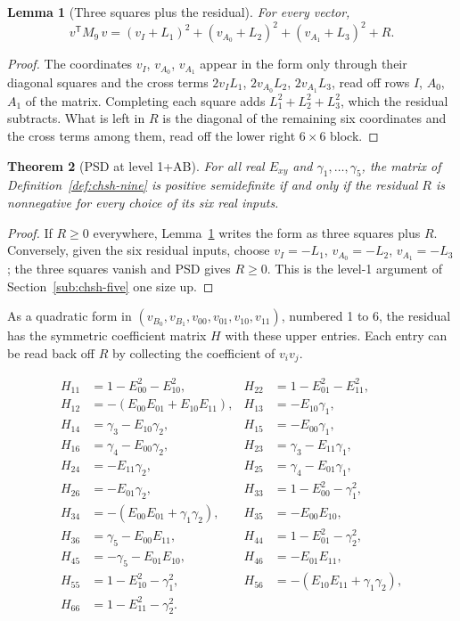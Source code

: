 \documentclass[11pt,twoside]{article}
\theoremstyle{thielethm}
\newtheorem{theorem}{Theorem}[section]
\newtheorem{lemma}[theorem]{Lemma}
\theoremstyle{thieledef}
\theoremstyle{thieledef}
\theoremstyle{thieledef}
\theoremstyle{thielethm}
\theoremstyle{thieleobs}
\theoremstyle{thielethm}
\begin{document}
\begin{lemma}[Three squares plus the residual]\label{lem:chsh-nine-sos}
For every vector,
\[
v^{\mathsf T} M_9\, v = (v_I + L_1)^2 + (v_{A_0} + L_2)^2 + (v_{A_1} + L_3)^2 + R.
\]
\end{lemma}

\begin{proof}
The coordinates $v_I$, $v_{A_0}$, $v_{A_1}$ appear in the form only through their diagonal
squares and the cross terms $2 v_I L_1$, $2 v_{A_0} L_2$, $2 v_{A_1} L_3$, read off rows
$I$, $A_0$, $A_1$ of the matrix. Completing each square adds $L_1^2 + L_2^2 + L_3^2$, which
the residual subtracts. What is left in $R$ is the diagonal of the remaining six coordinates
and the cross terms among them, read off the lower right $6 \times 6$ block.
\end{proof}

\begin{theorem}[PSD at level 1+AB]
For all real $E_{xy}$ and $\gamma_1, \ldots, \gamma_5$,
the matrix of Definition~\ref{def:chsh-nine} is positive semidefinite if and only if
the residual $R$ is nonnegative for every choice of its six real inputs.
\end{theorem}

\begin{proof}
If $R \ge 0$ everywhere, Lemma~\ref{lem:chsh-nine-sos} writes the form as three squares plus $R$.
Conversely, given the six residual inputs, choose $v_I = -L_1$, $v_{A_0} = -L_2$,
$v_{A_1} = -L_3$; the three squares vanish and PSD gives $R \ge 0$. This is the level-1
argument of Section~\ref{sub:chsh-five} one size up.
\end{proof}

As a quadratic form in $(v_{B_0},v_{B_1},v_{00},v_{01},v_{10},v_{11})$, numbered 1 to 6,
the residual has the symmetric coefficient matrix $H$ with these upper entries. Each entry
can be read back off $R$ by collecting the coefficient of $v_i v_j$.

\begin{align*}
H_{11} &= 1 - E_{00}^2 - E_{10}^2, & H_{22} &= 1 - E_{01}^2 - E_{11}^2, \\
H_{12} &= -(E_{00}E_{01} + E_{10}E_{11}), & H_{13} &= -E_{10}\gamma_1, \\
H_{14} &= \gamma_3 - E_{10}\gamma_2, & H_{15} &= -E_{00}\gamma_1, \\
H_{16} &= \gamma_4 - E_{00}\gamma_2, & H_{23} &= \gamma_3 - E_{11}\gamma_1, \\
H_{24} &= -E_{11}\gamma_2, & H_{25} &= \gamma_4 - E_{01}\gamma_1, \\
H_{26} &= -E_{01}\gamma_2, & H_{33} &= 1 - E_{00}^2 - \gamma_1^2, \\
H_{34} &= -(E_{00}E_{01} + \gamma_1\gamma_2), & H_{35} &= -E_{00}E_{10}, \\
H_{36} &= \gamma_5 - E_{00}E_{11}, & H_{44} &= 1 - E_{01}^2 - \gamma_2^2, \\
H_{45} &= -\gamma_5 - E_{01}E_{10}, & H_{46} &= -E_{01}E_{11}, \\
H_{55} &= 1 - E_{10}^2 - \gamma_1^2, & H_{56} &= -(E_{10}E_{11} + \gamma_1\gamma_2), \\
H_{66} &= 1 - E_{11}^2 - \gamma_2^2.
\end{align*}
\end{document}
